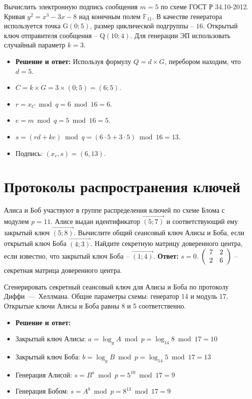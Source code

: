 \tasknumber Вычислить электронную подпись сообщения $m=5$ по схеме ГОСТ Р 34.10-2012. Кривая $y^2 = x^3 - 3 x - 8$ над конечным полем $\mathbb{F}_{11}$. В качестве генератора используется точка G$\left(0; 5\right)$, размер циклической подгруппы -- $16$. Открытый ключ отправителя сообщения -- Q$\left(10; 4\right)$. Для генерации ЭП использовать случайный параметр $k=3$.
\begin{itemize}
\item \textbf{Решение и ответ:} Используя формулу $Q = d \times G$, перебором находим, что $d = 5$.
\item $C = k \times G = 3 \times \left(0; 5\right) = \left(6; 5\right)$.
\item $r = x_C \bmod q = 6 \bmod 16 = 6$.
\item $e = m \bmod q = 5 \bmod 16 = 5$.
\item $s = ( r d + k e ) \bmod q = ( 6 \cdot 5 + 3 \cdot 5 ) \bmod 16 = 13$.
\item Подпись: $(x_c, s) = (6, 13)$.
\end{itemize}

\section{Протоколы распространения ключей}
\tasksection

\tasknumber Алиса и Боб участвуют в группе распределения ключей по схеме Блома с модулем $p = 11$. Алисе выдан идентификатор $\overrightarrow{(5; 7)}$ и соответствующий ему закрытый ключ $\overrightarrow{(5; 8)}$. Вычислите общий сеансовый ключ Алисы и Боба, если открытый ключ Боба $\overrightarrow{(4; 3)}$. Найдите секретную матрицу доверенного центра, если известно, что закрытый ключ Боба -- $\overrightarrow{(1; 4)}$.
\medbreak
\textbf{Ответ:} $s = 0$. $\left( {\begin{array}{*{20}c}
   7 & 2  \\
   2 & 6  \\
\end{array}} \right)$ -- секретная матрица доверенного центра.
\bigbreak

\tasknumber Сгенерировать секретный сеансовый ключ для Алисы и Боба по протоколу Диффи~---~Хеллмана. Общие параметры схемы: генератор 14 и модуль 17. Открытые ключи Алисы и Боба равны 8 и 5 соответственно.
\begin{itemize}
\item \textbf{Решение и ответ:}
\item Закрытый ключ Алисы: $a = \log_{g} A \bmod p = \log_{14} 8 \bmod 17 = 10$
\item Закрытый ключ Боба: $b = \log_{g} B \bmod p = \log_{14} 5 \bmod 17 = 13$
\item Генерация Алисой: $s = {B}^{a} \bmod p  = {5}^{10} \bmod 17 = 9$
\item Генерация Бобом: $s = {A}^{b} \bmod p  = {8}^{13} \bmod 17 = 9$
\end{itemize}

